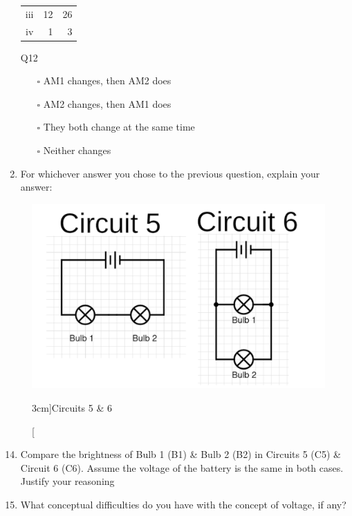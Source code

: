 \documentclass[a4paper,openany,nobib]{tufte-book}
\newcommand{\Qline}[1]{\noindent\rule{#1}{0.6pt}}
\newcounter{ql}
\newcommand{\Qlines}[1]{\forloop{ql}{0}{\value{ql}<#1}{\vskip0em\Qline{\linewidth}}}
\begin{document}
\begin{enumerate}
\begin{margintable}
\begin{center}
\begin{tabular}{crr}
		 iii & 12 & 26\\
		 iv & 1 & 3\\
		 \bottomrule
		\end{tabular}
		\caption{\centering Q12}
		\end{center}
		\end{margintable}
		\begin{itemize}
			\item[$\square$] AM1 changes, then AM2 does
			\item[$\square$] AM2 changes, then AM1 does
			\item[$\square$] They both change at the same time
			\item[$\square$] Neither changes
		\end{itemize}
\item For whichever answer you chose to the previous question, explain your answer:
		\Qlines{2}
\end{enumerate}
\newpage
{}
\begin{figure}[h!]
	\center
	\includegraphics[width=\linewidth]{comp}
	\caption[][3cm]{Circuits 5 \& 6}
\end{figure}
\begin{enumerate}
		\setcounter{enumi}{13}
		\item Compare the brightness of Bulb 1 (B1) \& Bulb 2 (B2) in Circuits 5 (C5) \& Circuit 6 (C6). Assume the voltage of the battery is the same in both cases. Justify your reasoning 
		\Qlines{2}
		\item What conceptual difficulties do you have with the concept of voltage, if any?
		\Qlines{2}
\end{enumerate}
\end{document}
